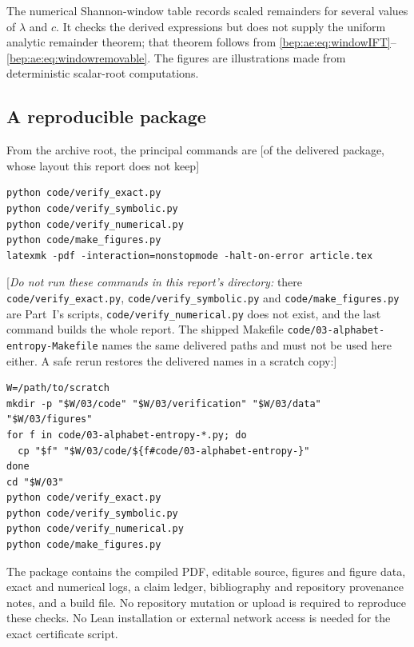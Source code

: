 \documentclass[11pt]{article}
\numberwithin{equation}{section}
\theoremstyle{definition}
\theoremstyle{remark}
\begin{document}
The numerical Shannon-window table records scaled remainders for several
values of $\lambda$ and $c$. It checks the derived expressions but does
not supply the uniform analytic remainder theorem; that theorem follows
from \eqref{bep:ae:eq:windowIFT}--\eqref{bep:ae:eq:windowremovable}. The figures are
illustrations made from deterministic scalar-root computations.

\subsection{A reproducible package}
From the archive root, the principal commands are
[of the delivered package, whose layout this report does not keep]
\begin{verbatim}
python code/verify_exact.py
python code/verify_symbolic.py
python code/verify_numerical.py
python code/make_figures.py
latexmk -pdf -interaction=nonstopmode -halt-on-error article.tex
\end{verbatim}
[\emph{Do not run these commands in this report's directory:} there
\nolinkurl{code/verify_exact.py}, \nolinkurl{code/verify_symbolic.py} and
\nolinkurl{code/make_figures.py} are Part~I's scripts,
\nolinkurl{code/verify_numerical.py} does not exist, and the last command
builds the whole report. The shipped Makefile
\nolinkurl{code/03-alphabet-entropy-Makefile} names the same delivered paths
and must not be used here either. A safe rerun restores the delivered names
in a scratch copy:]
\begin{verbatim}
W=/path/to/scratch
mkdir -p "$W/03/code" "$W/03/verification" "$W/03/data" "$W/03/figures"
for f in code/03-alphabet-entropy-*.py; do
  cp "$f" "$W/03/code/${f#code/03-alphabet-entropy-}"
done
cd "$W/03"
python code/verify_exact.py
python code/verify_symbolic.py
python code/verify_numerical.py
python code/make_figures.py
\end{verbatim}
The package contains the compiled PDF, editable source, figures and
figure data, exact and numerical logs, a claim ledger, bibliography and
repository provenance notes, and a build file. No repository mutation
or upload is required to reproduce these checks. No Lean installation
or external network access is needed for the exact certificate script.
\end{document}
